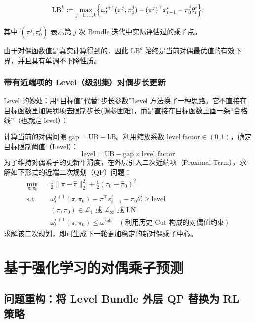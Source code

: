 \documentclass[11pt]{ctexart}
\begin{document}
\begin{equation}
\mathrm{LB}^{k}
:=
\max_{j=1,\ldots,k}
\Bigl\{
\omega_t^{i+1}(\pi^{j},\pi_0^{j})
-
(\pi^{j})^\top x_{t-1}^{i}
-
\pi_0^{j}\theta_t^{i}
\Bigr\}.
\end{equation}

其中 $(\pi^{j},\pi_0^{j})$ 表示第 $j$ 次 Bundle 迭代中实际评估过的乘子点。

由于对偶函数值是真实计算得到的，因此 $\mathrm{LB}^{k}$ 始终是当前对偶最优值的有效下界，并且具有单调不下降性质。




\subsubsection{带有近端项的 Level（级别集）对偶步长更新}

Level 的妙处：用“目标值”代替“步长参数”Level 方法换了一种思路。它不直接在目标函数里加惩罚项去限制步长(调参困难)，而是直接在目标函数上画一条“合格线”（也就是 $\text{level}$）：


计算当前的对偶间隙 $\text{gap} = \text{UB} - \text{LB}$。利用缩放系数 $\text{level\_factor} \in (0,1)$，确定目标限制阈值（Level）：
\begin{equation}
\text{level} = \text{UB} - \text{gap} \times \text{level\_factor}
\end{equation}
为了维持对偶乘子的更新平滑度，在外层引入二次近端项（Proximal Term），求解如下形式的近端二次规划（QP）问题：
\begin{align}
\min_{\pi, \pi_0} \quad & \frac{1}{2} \|\pi - \hat{\pi}\|_2^2 + \frac{1}{2} (\pi_0 - \hat{\pi}_0)^2 \\
\text{s.t.} \quad & \omega_t^{i+1}(\pi, \pi_0) - \pi^\top x_{t-1}^i - \pi_0 \theta_t^i \ge \text{level} \\
& (\pi, \pi_0) \in \mathcal{L}_1 \text{ 或 } \mathcal{L}_\infty \text{ 或 } \text{LN} \\
& \omega_t^{i+1}(\pi, \pi_0) \le \omega^{\text{sub}} \quad (\text{利用历史 Cut 构成的对偶值约束})
\end{align}
求解该二次规划，即可生成下一轮更加稳定的新对偶乘子中心。


\section{基于强化学习的对偶乘子预测}

\subsection{问题重构：将 Level Bundle 外层 QP 替换为 RL 策略}
\end{document}

